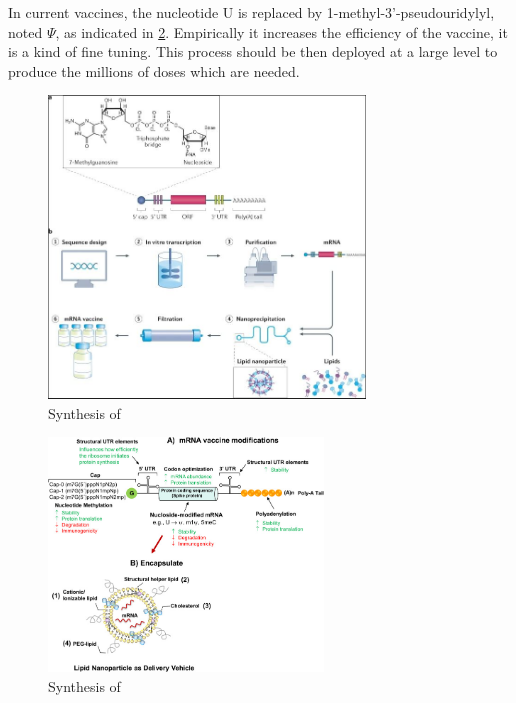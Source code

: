 \documentclass{article}
\begin{document}
            In current vaccines, the nucleotide U is replaced by 1-methyl-3'-pseudouridylyl, noted $\Psi$, as indicated in \ref{fig:mRNAvac_detail}.
            Empirically it increases the efficiency of the vaccine, it is a kind of fine tuning.
            This process should be then deployed at a large level to produce the millions of doses which are needed.

                        
            \begin{figure}
                \centering
                \includegraphics[width=0.75\textwidth]{imgs/mRNA_Vaccine.JPG}
                \caption{Synthesis of \autocite{MRNAVaccinesInfectious}}
                \label{fig:mRNAvac}
            \end{figure}
            
            \begin{figure}
                \centering
                \includegraphics[width=0.65\textwidth]{imgs/RNA2.jpg}
                \caption{Synthesis of \autocite{granados-riveronEngineeringCurrentNucleosidemodified2021}}
                \label{fig:mRNAvac_detail}
            \end{figure}
\end{document}
